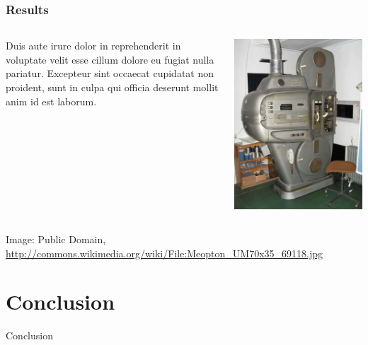 \documentclass{beamer}
\begin{document}
\begin{frame}
  \frametitle{Results}
  \begin{columns}
    \begin{column}{0.6\textwidth}
      Duis aute irure dolor in reprehenderit in voluptate velit
      esse cillum dolore eu fugiat nulla pariatur. Excepteur sint
      occaecat cupidatat non proident, sunt in culpa qui officia
      deserunt mollit anim id est laborum.
    \end{column}
    \begin{column}{0.4\textwidth}
      \includegraphics[width=1\textwidth]{Meopton_UM70x35_69118.jpg}
    \end{column}
  \end{columns}
  \begin{flushright}
    { \tiny Image: Public Domain,
      \url{http://commons.wikimedia.org/wiki/File:Meopton_UM70x35_69118.jpg}
    }
  \end{flushright}
\end{frame}

\section{Conclusion}

\begin{frame}{Conclusion}
\end{frame}
\end{document}

